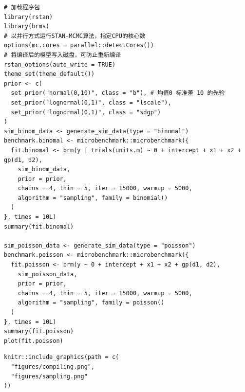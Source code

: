 \documentclass[12pt,a4paper,UTF8,twoside]{book}
\theoremstyle{definition}
\theoremstyle{definition}
\theoremstyle{definition}
\theoremstyle{remark}
\begin{document}
\begin{verbatim}
# 加载程序包
library(rstan)
library(brms)
# 以并行方式运行STAN-MCMC算法，指定CPU的核心数
options(mc.cores = parallel::detectCores())
# 将编译后的模型写入磁盘，可防止重新编译
rstan_options(auto_write = TRUE)
theme_set(theme_default())
prior <- c(
  set_prior("normal(0,10)", class = "b"), # 均值0 标准差 10 的先验
  set_prior("lognormal(0,1)", class = "lscale"),
  set_prior("lognormal(0,1)", class = "sdgp")
)
sim_binom_data <- generate_sim_data(type = "binomal")
benchmark.binomal <- microbenchmark::microbenchmark({
  fit.binomal <- brm(y | trials(units.m) ~ 0 + intercept + x1 + x2 + gp(d1, d2),
    sim_binom_data,
    prior = prior,
    chains = 4, thin = 5, iter = 15000, warmup = 5000,
    algorithm = "sampling", family = binomial()
  )
}, times = 10L)
summary(fit.binomal)

sim_poisson_data <- generate_sim_data(type = "poisson")
benchmark.poisson <- microbenchmark::microbenchmark({
  fit.poisson <- brm(y ~ 0 + intercept + x1 + x2 + gp(d1, d2),
    sim_poisson_data,
    prior = prior,
    chains = 4, thin = 5, iter = 15000, warmup = 5000, 
    algorithm = "sampling", family = poisson()
  )
}, times = 10L)
summary(fit.poisson)
plot(fit.poisson)
\end{verbatim}

\begin{verbatim}
knitr::include_graphics(path = c(
  "figures/compiling.png", 
  "figures/sampling.png"
))
\end{verbatim}


\backmatter
\end{document}
